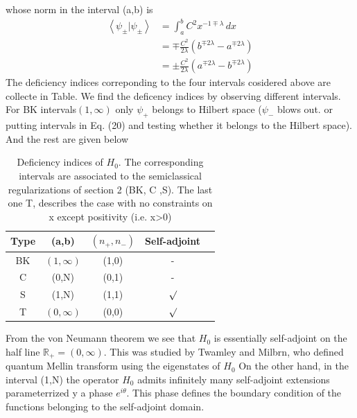 \documentclass[12pt]{report}
\newcommand*{\1}{\hspace{1pt}}
\begin{document}
        whose norm in the interval (a,b) is
        \begin{equation}
            \begin{split}
            \left\langle \psi_{\pm} | \psi_{\pm} \right\rangle &= \int_{a}^{b} C^{2} x^{-1\mp \lambda} \,dx \\
            &= \mp \frac{C^{2}}{2\lambda}\left(b^{\mp 2\lambda} - a^{\mp 2\lambda}\right) \\  
            &= \pm \frac{C^{2}}{2\lambda}\left(a^{\mp 2\lambda} - b^{\mp 2\lambda}\right) 
            \end{split}
        \end{equation}
        The deficiency indices correponding to the four intervals cosidered above are collecte in Table\cite{s8}. We find the deficency indices by observing different intervals.
        For BK intervals$(1,\infty)$ only $\psi_{+}$ belongs to Hilbert space ($\psi_{-}$ blows out. or putting intervals in Eq. (20) and testing whether it belongs to
        the Hilbert space)\cite{s7}. And the rest are given below
        
        \begin{longtable}[c]{c c c c c}
            \caption{Deficiency indices of $H_{0}$. The corresponding intervals are associated to the semiclassical regularizations of section 2 (BK, C ,S).
            The last one T, describes the case with no constraints on x except positivity (i.e. x>0)} \\
            \hline
             Type & (a,b) & $(n_{+}, n_{-})$ & Self-adjoint\\
             \hline 
             BK & $(1,\infty)$ & (1,0) & -\\  
             C & (0,N) & (0,1) &  -\\ 
             S & (1,N) & (1,1) & $\surd$ \\ 
             T & $(0,\infty)$ & (0,0) & $\surd $\\ 
            \hline
        \end{longtable}


        From the von Neumann theorem we see that $H_{0}$ is essentially self-adjoint on the half line $\mathbb{R} _{+} = (0, \infty)$. This was studied by Twamley and Milbrn, who
        defined quantum Mellin transform using the eigenstates of $H_{0}$\cite{s9}
        On the other hand, in the interval (1,N) the operator $H_{0}$ admits infinitely many self-adjoint extensions parameterrized y a phase $e^{i\theta}$. This phase defines the 
        boundary condition of the functions belonging to the self-adjoint domain.\cite{s7}
\end{document}
